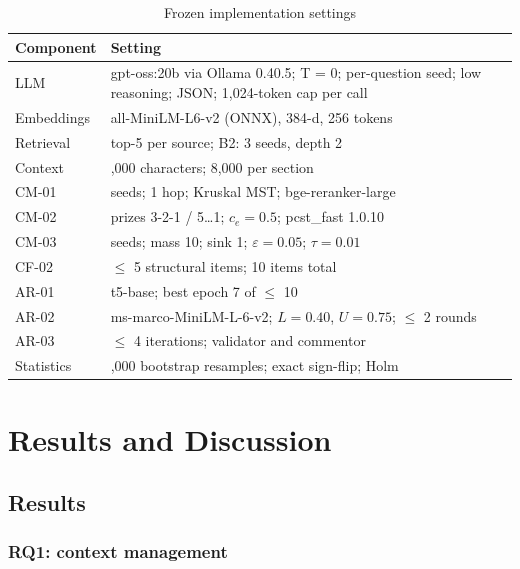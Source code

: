 \documentclass[conference]{IEEEtran}
\begin{document}
\begin{table}[!t]
\caption{Frozen implementation settings}
\label{tab:settings}
\centering
\footnotesize
\setlength{\tabcolsep}{3pt}
\renewcommand{\arraystretch}{1.1}
\begin{tabular}{@{}>{\raggedright\arraybackslash}p{}>{\raggedright\arraybackslash}p{}@{}}
\toprule
\textbf{Component} & \textbf{Setting} \\
\midrule
LLM & gpt-oss:20b via Ollama 0.40.5; T = 0; per-question seed; low reasoning; JSON; 1,024-token cap per call \\
Embeddings & all-MiniLM-L6-v2 (ONNX), 384-d, 256 tokens \\
Retrieval & top-5 per source; B2: 3 seeds, depth 2 \\
Context & 24,000 characters; 8,000 per section \\
CM-01 & 10 seeds; 1 hop; Kruskal MST; bge-reranker-large \\
CM-02 & prizes 3-2-1 / 5\ldots{}1; $c_e=0.5$; pcst\_fast 1.0.10 \\
CM-03 & 20 seeds; mass 10; sink 1; $\varepsilon =0.05$; $\tau =0.01$ \\
CF-02 & $\le$ 5 structural items; 10 items total \\
AR-01 & t5-base; best epoch 7 of $\le$ 10 \\
AR-02 & ms-marco-MiniLM-L-6-v2; $L=0.40$, $U=0.75$; $\le$ 2 rounds \\
AR-03 & $\le$ 4 iterations; validator and commentor \\
Statistics & 10,000 bootstrap resamples; exact sign-flip; Holm \\
\bottomrule
\end{tabular}
\end{table}

\section{Results and Discussion}\label{sec:results}

\subsection{Results}

\subsubsection{RQ1: context management}
\end{document}
